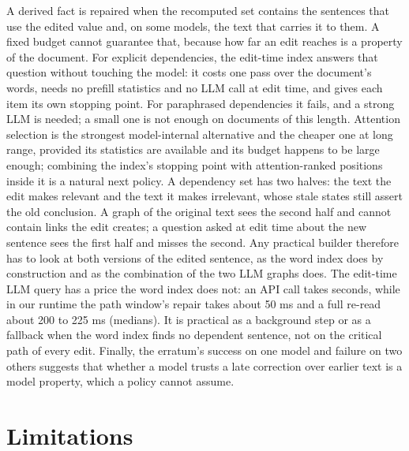 \documentclass[conference]{IEEEtran}
\begin{document}
A derived fact is repaired when the recomputed set contains the sentences that use the edited value and, on
some models, the text that carries it to them. A fixed budget cannot guarantee that, because how far an edit
reaches is a property of the document. For explicit dependencies, the edit-time index answers that question
without touching the model: it costs one pass over the document's words, needs no prefill statistics and no LLM
call at edit time, and gives each item its own stopping point. For paraphrased dependencies it fails, and a
strong LLM is needed; a small one is not enough on documents of this length. Attention selection is the strongest model-internal alternative and
the cheaper one at long range, provided its statistics are available and its budget happens to be large
enough; combining the index's stopping point with attention-ranked positions inside it is a natural next
policy. A dependency set has two halves: the text the edit makes relevant and the text it makes irrelevant,
whose stale states still assert the old conclusion. A graph of the original text sees the second half and
cannot contain links the edit creates; a question asked at edit time about the new sentence sees the first
half and misses the second. Any practical builder therefore has to look at both versions of the edited
sentence, as the word index does by construction and as the combination of the two LLM graphs does. The
edit-time LLM query has a price the word index does not: an API call takes seconds, while in our runtime the
path window's repair takes about 50 ms and a full re-read about 200 to 225 ms (medians). It is practical as a
background step or as a fallback when the word index finds no dependent sentence, not on the critical path of
every edit. Finally, the erratum's success on one model and failure on two others suggests that
whether a model trusts a late correction over earlier text is a model property, which a policy cannot assume.

\section{Limitations}
\end{document}
